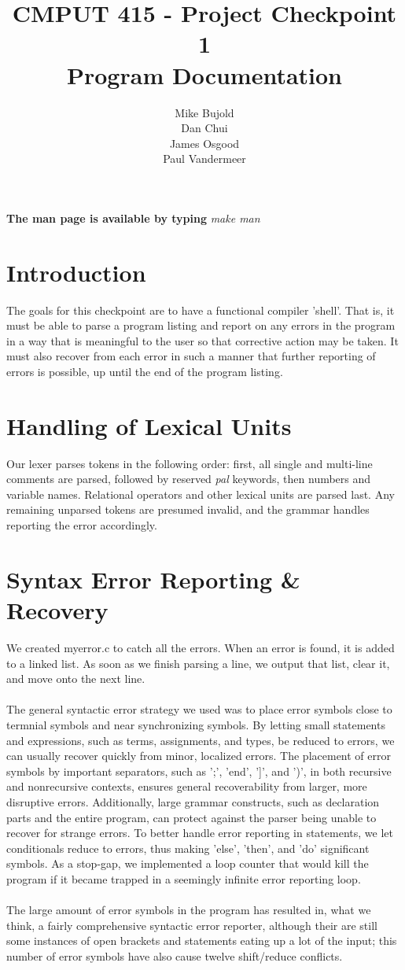 \documentclass{report}
\title{CMPUT 415 - Project Checkpoint 1\\Program Documentation}
\author{Mike Bujold \\
Dan Chui \\ 
James Osgood \\
Paul Vandermeer}
\begin{document}
\maketitle
\textbf{The man page is available by typing} \emph{make man}

\section*{Introduction}
The goals for this checkpoint are to have a functional compiler 'shell'. That is, it must be able to parse a program listing and report on any errors in the program in a way that is meaningful to the user so that corrective action may be taken. It must also recover from each error in such a manner that further reporting of errors is possible, up until the end of the program listing.


\section*{Handling of Lexical Units}
Our lexer parses tokens in the following order: first, all single and multi-line comments are parsed, followed by reserved \emph{pal} keywords, then numbers and variable names. Relational operators and other lexical units are parsed last. Any remaining unparsed tokens are presumed invalid, and the grammar handles reporting the error accordingly.


\section*{Syntax Error Reporting \& Recovery}
We created myerror.c to catch all the errors. When an error is found, it is added to a linked list. As soon as we finish parsing a line, we output that list, clear it, and move onto the next line.
\\
\\
The general syntactic error strategy we used was to place error symbols close to termnial symbols and near synchronizing symbols. 
By letting small statements and expressions, such as terms, assignments, and types, be reduced to errors, we can usually recover quickly from minor, localized errors. 
The placement of error symbols by important separators, such as ';', 'end', ']', and ')', in both recursive and nonrecursive contexts, ensures general recoverability from larger, more disruptive errors.
Additionally, large grammar constructs, such as declaration parts and the entire program, can protect against the parser being unable to recover for strange errors. 
To better handle error reporting in statements, we let conditionals reduce to errors, thus making 'else', 'then', and 'do' significant symbols. As a stop-gap, we implemented a loop counter that would kill the program if it became trapped in a seemingly infinite error reporting loop.
\\
\\
The large amount of error symbols in the program has resulted in, what we think, a fairly comprehensive syntactic error reporter, although their are still some instances of open brackets and statements eating up a lot of the input; this number of error symbols have also cause twelve shift/reduce conflicts.
\end{document}
